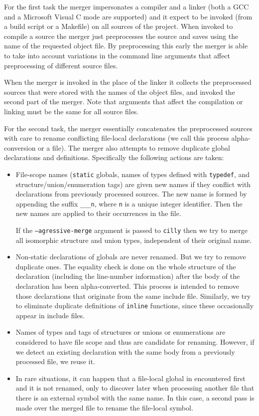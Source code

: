 \documentclass{article}
\def\t#1{{\tt #1}}
\begin{document}
 For the first task the merger impersonates a compiler and a linker (both a
GCC and a Microsoft Visual C mode are supported) and it expect to be invoked
(from a build script or a Makefile) on all sources of the project. When
invoked to compile a source the merger just preprocesses the source and
saves using the name of the requested object file. By preprocessing this early
the merger is able to take into account variations in the command line
arguments that affect preprocessing of different source files. 

 When the merger is invoked in the place of the linker it collects the
preprocessed sources that were stored with the names of the object files, and
invoked the second part of the merger. Note that arguments that affect the
compilation or linking must be the same for all source files.

 For the second task, the merger essentially concatenates the preprocessed
sources with care to rename conflicting file-local declarations (we call this
process alpha-conversion or a file). The merger also attempts to remove
duplicate global declarations and definitions. Specifically the following
actions are taken: 

\begin{itemize}
\item File-scope names (\t{static} globals, names of types defined with
\t{typedef}, and structure/union/enumeration tags) are given new names if they
conflict with declarations from previously processed sources. The new name is
formed by appending the suffix \t{\_\_\_n}, where \t{n} is a unique integer
identifier. Then the new names are applied to their occurrences in the file. 

 If the \t{--agressive-merge} argument is passed to \t{cilly} then we try to
merge all isomorphic structure and union types, independent of their original
name. 

\item Non-static declarations of globals are never renamed. But we try to
remove duplicate ones. The equality check is done on the whole structure of
the declaration (including the line-number information) after the body of the
declaration has been alpha-converted. This process is intended to remove those
declarations that originate from the same include file. Similarly, we try to
eliminate duplicate definitions of \t{inline} functions, since these
occasionally appear in include files.

\item Names of types and tags of structures or unions or enumerations are
considered to have file scope and thus are candidate for renaming. However, if
we detect an existing declaration with the same body from a previously
processed file, we reuse it.

\item In rare situations, it can happen that a file-local global in
encountered first and it is not renamed, only to discover later when
processing another file that there is an external symbol with the same name.
In this case, a second pass is made over the merged file to rename the
file-local symbol. 
\end{itemize}
\end{document}
